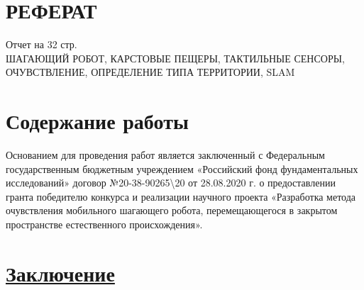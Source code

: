 \documentclass[a4paper,14pt,oneside,openany,article]{memoir} %
\begin{document}
% 
% 
\mainmatter*                  %
\setcounter{page}{2}

\section*{РЕФЕРАТ}
Отчет на 32 стр.\\
ШАГАЮЩИЙ РОБОТ, КАРСТОВЫЕ ПЕЩЕРЫ, ТАКТИЛЬНЫЕ СЕНСОРЫ, ОЧУВСТВЛЕНИЕ, ОПРЕДЕЛЕНИЕ ТИПА ТЕРРИТОРИИ, SLAM \\



\tableofcontents
{}                          %
\section*{Содержание работы}
Основанием для проведения работ является заключенный с Федеральным государственным бюджетным учреждением «Российский фонд фундаментальных исследований» договор №20-38-90265\textbackslash 20 от 28.08.2020 г. о предоставлении гранта победителю конкурса и реализации научного проекта «Разработка метода очувствления мобильного шагающего робота, перемещающегося в закрытом пространстве естественного происхождения».





\section*{\underline{Заключение}}


\insertbiblioauthorgrouped

\end{document}
